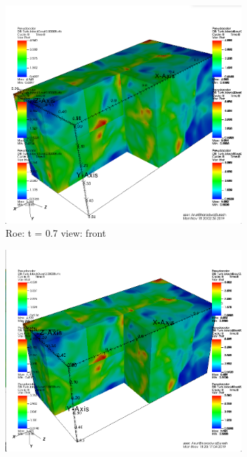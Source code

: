 \documentclass[12pt]{article}
\begin{document}
\begin{figure}[h]
\centering
\begin{subfigure}[h]{0.4500\textwidth}
	\centering
	\includegraphics[width=\textwidth]{roet8b.png}
	\caption{Roe: t = 0.7 view: front}
\end{subfigure}
\begin{subfigure}[h]{0.4500\textwidth}
	\centering
	\includegraphics[width=\textwidth]{hllct8b.png}

\end{subfigure}
\end{figure}
\end{document}
